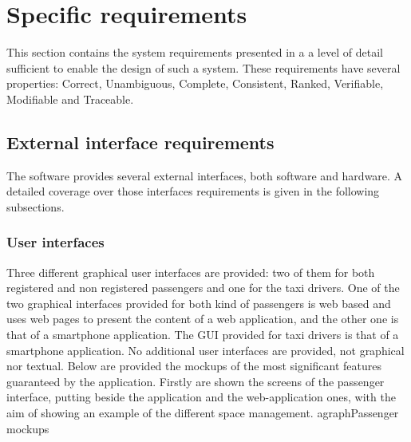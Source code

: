 \section{Specific requirements}
This section contains the system requirements presented in a a level of detail sufficient to enable the design of such a system.
These requirements have several properties: Correct, Unambiguous, Complete, Consistent, Ranked, Verifiable, Modifiable and Traceable.
\subsection{External interface requirements}
The software \myTaxiService{} provides several external interfaces, both software and hardware.
A detailed coverage over those interfaces requirements is given in the following subsections.
\subsubsection{User interfaces}
Three different graphical user interfaces are provided: two of them for both registered and non registered passengers and one for the taxi drivers.
One of the two graphical interfaces provided for both kind of passengers is web based and uses web pages to present the content of a web application, and the other one is that of a smartphone application.
The GUI provided for taxi drivers is that of a smartphone application.
No additional user interfaces are provided, not graphical nor textual.
Below are provided the mockups of the  most significant features guaranteed by the application.
Firstly are shown the screens of the passenger interface, putting beside the application and the web-application ones, with the aim of showing an example of the different space management. 
agraph{Passenger mockups}
\begin{itemize}
\end{itemize}

